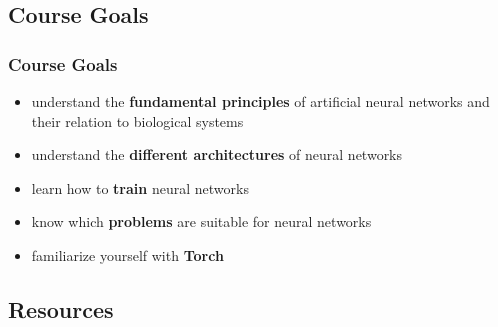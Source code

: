 \subsection{Course Goals}
\label{sec:goals}

\begin{frame}
  \frametitle{Course Goals}
  \begin{itemize}
  \item understand the \textbf{fundamental principles} of artificial neural
    networks and their relation to biological systems
  \item understand the \textbf{different architectures} of neural networks
  \item learn how to \textbf{train} neural networks
  \item know which \textbf{problems} are suitable for neural networks
  \item familiarize yourself with \textbf{Torch}
  \end{itemize}
\end{frame}

\subsection{Resources}
\label{sec:resources}

